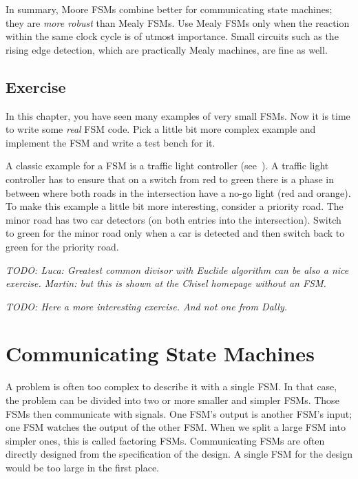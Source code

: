 \documentclass[%
    10pt,
    headinclude, footexclude,
    openright, %
    notitlepage,
    cleardoubleempty,
    headsepline,
    pointlessnumbers,
    bibtotoc, idxtotoc,
    ]{scrbook}
\newcommand{\todo}[1]{{\emph{TODO: #1}}}
\begin{document}
In summary, Moore FSMs combine better for communicating state machines; they
are \emph{more robust} than Mealy FSMs. Use Mealy FSMs only when the reaction within the same
clock cycle is of utmost importance. Small circuits such as the rising edge detection,
which are practically Mealy machines, are fine as well.

\section{Exercise}

In this chapter, you have seen many examples of very small FSMs.
Now it is time to write some \emph{real} FSM code.
Pick a little bit more complex example and implement the FSM and
write a test bench for it.

A classic example for a FSM is a traffic light controller (see~\cite[Section~14.3]{dally:vhdl:2016}).
A traffic light controller has to ensure that on a switch from red to green
there is a phase in between where both roads in the intersection
have a no-go light (red and orange).
To make this example a little bit more interesting, consider a priority road.
The minor road has two car detectors (on both entries into the intersection).
Switch to green for the minor road only when a car is detected and then switch
back to green for the priority road.

\todo{Luca: Greatest common divisor with Euclide algorithm can be also a nice exercise.
Martin: but this is shown at the Chisel homepage without an FSM.}

\todo{Here a more interesting exercise. And not one from Dally.}

\chapter{Communicating State Machines}

A problem is often too complex to describe it with a single FSM.
In that case, the problem can be divided into two or more smaller and simpler FSMs.
Those FSMs then communicate with signals. One FSM's output is
another FSM's input; one FSM watches the output of the other FSM.
When we split a large FSM into simpler ones, this is called factoring FSMs.
Communicating FSMs are often directly designed from the specification
of the design. A single FSM for the design would be too large in the first place.
\end{document}
